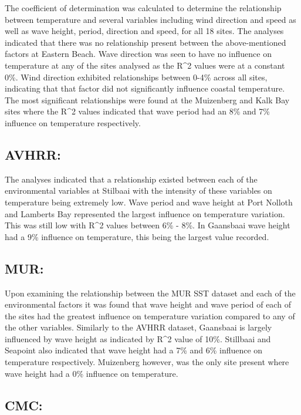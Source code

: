 \documentclass[12pt,]{article}
\begin{document}
The coefficient of determination was calculated to determine the
relationship between temperature and several variables including wind
direction and speed as well as wave height, period, direction and speed,
for all 18 sites. The analyses indicated that there was no relationship
present between the above-mentioned factors at Eastern Beach. Wave
direction was seen to have no influence on temperature at any of the
sites analysed as the R\^{}2 values were at a constant 0\%. Wind
direction exhibited relationships between 0-4\% across all sites,
indicating that that factor did not significantly influence coastal
temperature. The most significant relationships were found at the
Muizenberg and Kalk Bay sites where the R\^{}2 values indicated that
wave period had an 8\% and 7\% influence on temperature respectively.

\subsection{AVHRR:}\label{avhrr-1}

The analyses indicated that a relationship existed between each of the
environmental variables at Stilbaai with the intensity of these
variables on temperature being extremely low. Wave period and wave
height at Port Nolloth and Lamberts Bay represented the largest
influence on temperature variation. This was still low with R\^{}2
values between 6\% - 8\%. In Gaansbaai wave height had a 9\% influence
on temperature, this being the largest value recorded.

\subsection{MUR:}\label{mur-1}

Upon examining the relationship between the MUR SST dataset and each of
the environmental factors it was found that wave height and wave period
of each of the sites had the greatest influence on temperature variation
compared to any of the other variables. Similarly to the AVHRR dataset,
Gaansbaai is largely influenced by wave height as indicated by R\^{}2
value of 10\%. Stillbaai and Seapoint also indicated that wave height
had a 7\% and 6\% influence on temperature respectively. Muizenberg
however, was the only site present where wave height had a 0\% influence
on temperature.

\subsection{CMC:}\label{cmc-1}
\end{document}
